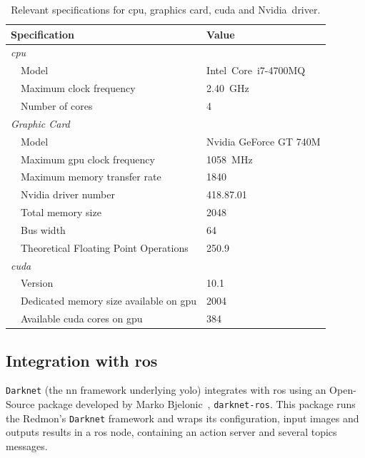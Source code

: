\begin{table}[!ht]
	\renewcommand{\arraystretch}{1.2}
	\centering
	\begin{tabular}{@{}lp{7cm}l@{}}
		\toprule
		\multicolumn{2}{l}{Specification} & Value \\ \midrule
		\multicolumn{2}{l}{\emph{\ac{cpu}}} & \\
		\phantom{a} & Model   & Intel\cp~Core\texttrademark~i7-4700MQ \\
								& Maximum clock frequency & \SI{2.40}{\giga\hertz} \\
								& Number of cores & 4 \\ 
		\midrule
		\multicolumn{2}{l}{\emph{Graphic Card}} & \\
		\phantom{a} & Model   & Nvidia GeForce GT 740M \\
								& Maximum \ac{gpu} clock frequency & \SI{1058}{\mega\hertz} \\
								&	Maximum memory transfer rate & \SI{1840}{\mega\byte} \\
								&	Nvidia driver number & 418.87.01 \\
								& Total memory size & \SI{2048}{\mega\byte} \\
								& Bus width & \SI{64}{\bytes} \\
								& Theoretical Floating Point Operations & \SI{250.9}{\giga\flops} \\
		\midrule 
		\multicolumn{2}{l}{\emph{\ac{cuda}\texttrademark}} \\
								&	Version & 10.1 \\
								&	Dedicated memory size available on \ac{gpu}& \SI{2004}{\mega\byte} \\
								& Available \ac{cuda} cores on \ac{gpu} & 384 \\
		\bottomrule
	\end{tabular}
	\caption[Relevant specifications for \acs{cpu}, graphics card, \acs{cuda} and Nvidia\texttrademark~driver.]{Relevant specifications for \ac{cpu}, graphics card, \ac{cuda} and Nvidia\texttrademark~driver.}
	\label{tab:computer-specs}
\end{table}


\subsection{Integration with \ac{ros}}
\texttt{Darknet} (the \ac{nn} framework underlying \ac{yolo}) integrates with \ac{ros} using an Open-Source package developed by Marko Bjelonic~\cite{MarkoBjelonic}, \texttt{darknet-ros}. This package runs the Redmon's \texttt{Darknet} framework and wraps its configuration, input images and outputs results in a \ac{ros} node, containing an action server and several topics messages.

